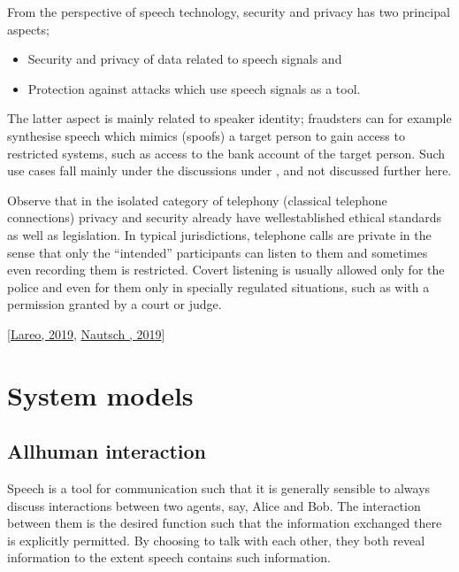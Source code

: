 \documentclass[letterpaper,10pt,english]{jupyterBook}
\begin{document}
\sphinxAtStartPar
From the perspective of speech technology, security and privacy has two
principal aspects;
\begin{itemize}
\item {} 
\sphinxAtStartPar
Security and privacy of data related to speech signals and

\item {} 
\sphinxAtStartPar
Protection against attacks which use speech signals as a tool.

\end{itemize}

\sphinxAtStartPar
The latter aspect is mainly related to speaker identity; fraudsters can
for example synthesise speech which mimics (spoofs) a target person to
gain access to restricted systems, such as access to the bank account of
the target person. Such use cases fall mainly under the discussions
under {\hyperref[\detokenize{Recognition/Speaker_Recognition_and_Verification::doc}]{}}, and not discussed
further here.

\sphinxAtStartPar
Observe that in the isolated category of telephony (classical telephone
connections) privacy and security already have well\sphinxhyphen{}established ethical
standards as well as legislation. In typical jurisdictions, telephone
calls are private in the sense that only the “intended” participants can
listen to them and sometimes even recording them is restricted. Covert
listening is usually allowed only for the police and even for them only
in specially regulated situations, such as with a permission granted by
a court or judge.

\sphinxAtStartPar
{[}\hyperlink{cite.Security_and_privacy:id43}{Lareo, 2019}, \hyperlink{cite.Security_and_privacy:id51}{Nautsch , 2019}{]}


\section{System models}
\label{\detokenize{Security_and_privacy:system-models}}

\subsection{All\sphinxhyphen{}human interaction}
\label{\detokenize{Security_and_privacy:all-human-interaction}}
\sphinxAtStartPar
Speech is a tool for communication such that it is generally sensible to always discuss interactions between two agents, say, Alice and Bob. The interaction between them is the desired function such that the information exchanged there is explicitly permitted. By choosing to talk with each other, they both reveal information to the extent speech contains such information.
\end{document}
